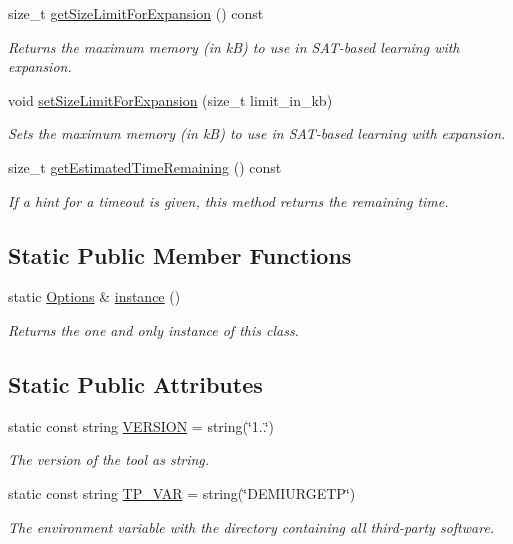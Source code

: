 \begin{DoxyCompactItemize}
$$size\-\_\-t \hyperlink{classOptions_aa59992b1b4c698ade25627bb19a7d055}{get\-Size\-Limit\-For\-Expansion} () const 
\begin{DoxyCompactList}\small\item\em Returns the maximum memory (in k\-B) to use in S\-A\-T-\/based learning with expansion. \end{DoxyCompactList}\item 
void \hyperlink{classOptions_a868b7bdc9dba80f7dd205d4514cb28a5}{set\-Size\-Limit\-For\-Expansion} (size\-\_\-t limit\-\_\-in\-\_\-kb)
\begin{DoxyCompactList}\small\item\em Sets the maximum memory (in k\-B) to use in S\-A\-T-\/based learning with expansion. \end{DoxyCompactList}\item 
size\-\_\-t \hyperlink{classOptions_a6c8af68dd937162e84a27da3c43c131b}{get\-Estimated\-Time\-Remaining} () const 
\begin{DoxyCompactList}\small\item\em If a hint for a timeout is given, this method returns the remaining time. \end{DoxyCompactList}\end{DoxyCompactItemize}
\subsection*{Static Public Member Functions}
\begin{DoxyCompactItemize}
\item 
static \hyperlink{classOptions}{Options} \& \hyperlink{classOptions_a3ee81ffdab9838ceb8f6f43fac679869}{instance} ()
\begin{DoxyCompactList}\small\item\em Returns the one and only instance of this class. \end{DoxyCompactList}\end{DoxyCompactItemize}
\subsection*{Static Public Attributes}
\begin{DoxyCompactItemize}
\item 
static const string \hyperlink{classOptions_ab8a901c1ad7d3ab672db099fb4c0b197}{V\-E\-R\-S\-I\-O\-N} = string(\char`\"{}1..\char`\"{})
\begin{DoxyCompactList}\small\item\em The version of the tool as string. \end{DoxyCompactList}\item 
static const string \hyperlink{classOptions_ad3285bfd4c5984cd79988ddce49ee507}{T\-P\-\_\-\-V\-A\-R} = string(\char`\"{}D\-E\-M\-I\-U\-R\-G\-E\-T\-P\char`\"{})
\begin{DoxyCompactList}\small\item\em The environment variable with the directory containing all third-\/party software. \end{DoxyCompactList}\end{DoxyCompactItemize}
